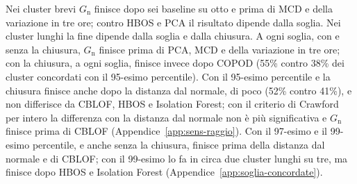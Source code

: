 Nei cluster brevi $G_{\mathrm{n}}$ finisce dopo sei baseline su otto e prima di MCD e della variazione in tre ore; contro HBOS e PCA il risultato dipende dalla soglia. Nei cluster lunghi la fine dipende dalla soglia e dalla chiusura. A ogni soglia, con e senza la chiusura, $G_{\mathrm{n}}$ finisce prima di PCA, MCD e della variazione in tre ore; con la chiusura, a ogni soglia, finisce invece dopo COPOD (55\% contro 38\% dei cluster concordati con il 95-esimo percentile). Con il 95-esimo percentile e la chiusura finisce anche dopo la distanza dal normale, di poco (52\% contro 41\%), e non differisce da CBLOF, HBOS e Isolation Forest; con il criterio di Crawford per intero la differenza con la distanza dal normale non è più significativa e $G_{\mathrm{n}}$ finisce prima di CBLOF (Appendice~\ref{app:sens-raggio}). Con il 97-esimo e il 99-esimo percentile, e anche senza la chiusura, finisce prima della distanza dal normale e di CBLOF; con il 99-esimo lo fa in circa due cluster lunghi su tre, ma finisce dopo HBOS e Isolation Forest (Appendice~\ref{app:soglia-concordate}).

